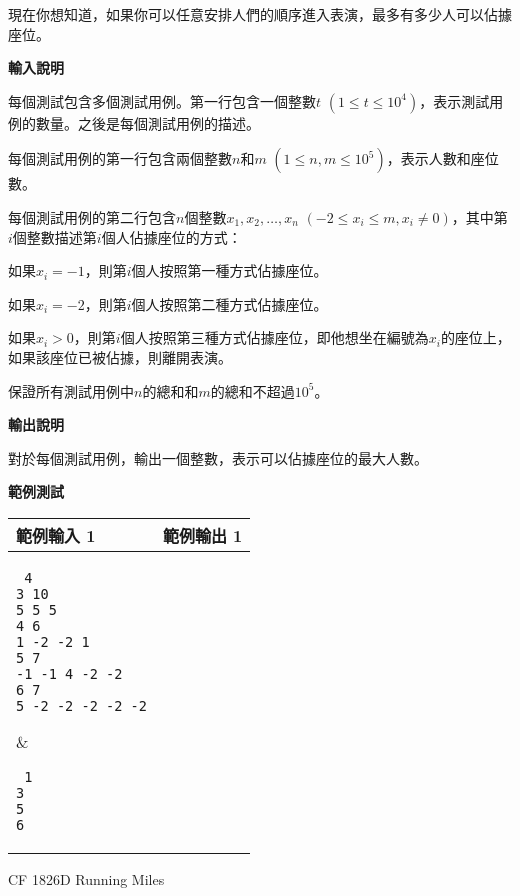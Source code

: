     現在你想知道，如果你可以任意安排人們的順序進入表演，最多有多少人可以佔據座位。

    \textbf{輸入說明}

    每個測試包含多個測試用例。第一行包含一個整數$t$ $(1 \le t \le 10^4)$，表示測試用例的數量。之後是每個測試用例的描述。

    每個測試用例的第一行包含兩個整數$n$和$m$ $(1 \le n, m \le 10^5)$，表示人數和座位數。
    
    每個測試用例的第二行包含$n$個整數$x_1, x_2, \ldots, x_n$ $(-2 \le x_i \le m, x_i \ne 0)$，其中第$i$個整數描述第$i$個人佔據座位的方式：
    
    如果$x_i = -1$，則第$i$個人按照第一種方式佔據座位。
    
    如果$x_i = -2$，則第$i$個人按照第二種方式佔據座位。
    
    如果$x_i > 0$，則第$i$個人按照第三種方式佔據座位，即他想坐在編號為$x_i$的座位上，如果該座位已被佔據，則離開表演。
    
    保證所有測試用例中$n$的總和和$m$的總和不超過$10^5$。

    \textbf{輸出說明}

    對於每個測試用例，輸出一個整數，表示可以佔據座位的最大人數。

    \textbf{範例測試}

    \begin{tabular}{|m{7cm}|m{7cm}|}
        \hline
        範例輸入 1 & 範例輸出 1 \\
        \hline
        \parbox[t]{7cm} %
        { \tt
        4 \\
        3 10 \\
        5 5 5 \\
        4 6 \\
        1 -2 -2 1 \\
        5 7 \\
        -1 -1 4 -2 -2 \\
        6 7 \\
        5 -2 -2 -2 -2 -2 \\
        } &
        \parbox[t]{7cm}
        { \tt
        1 \\
        3 \\
        5 \\
        6   \\        
        } \\
        \hline
    \end{tabular}

    \problem CF 1826D Running Miles

